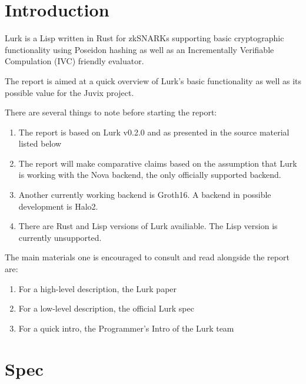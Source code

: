 \documentclass[
    9pt,            %
    techreport,        %
    affiltop,       %
]{art}
\begin{document}
\maketitle

\tableofcontents

\section{Introduction}

Lurk is a Lisp written in Rust for zkSNARKs supporting basic cryptographic functionality using Poseidon hashing as well as an Incrementally Verifiable Compulation (IVC) friendly evaluator.

The report is aimed at a quick overview of Lurk's basic functionality as well as its possible value for the Juvix project. 

There are several things to note before starting the report:

\begin{enumerate}
    \item The report is based on Lurk v0.2.0 and as presented in the source material listed below 
    \item The report will make comparative claims based on the assumption that Lurk is working with the Nova backend, the only officially supported backend.
    \item Another currently working backend is Groth16. A backend in possible development is Halo2.
    \item There are Rust and Lisp versions of Lurk availiable. The Lisp version is currently unsupported.
\end{enumerate}

The main materials one is encouraged to consult and read alongside the report are:

\begin{enumerate}
    \item For a high-level description, the Lurk paper \cite{Lurk-paper}
    \item For a low-level description, the official Lurk spec \cite{Lurk-spec}
    \item For a quick intro, the Programmer's Intro of the Lurk team \cite{Lurk-intro}
\end{enumerate}

\section{Spec}
\end{document}
